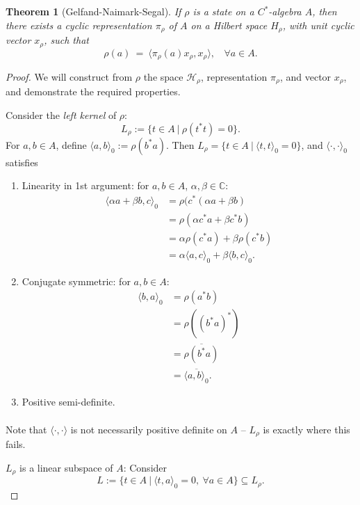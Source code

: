 \documentclass[12pt,a4paper]{amsart}
\theoremstyle{plain}
\newtheorem{thm}{Theorem}
\theoremstyle{definition}
\newcommand{\Hr}{\mathcal{H}_\rho}
\newcommand{\1}{\mathbbm{1}}
\begin{document}
\begin{thm} [Gelfand-Naimark-Segal]
	If $\rho$ is a state on a $C^\ast$-algebra $A$, then there exists a cyclic representation 
	$\pi_\rho$ of $A$ on a Hilbert space ${H}_\rho$, with unit cyclic vector $x_\rho$, such that 
	\[ 
		\rho(a)~=~ \langle \pi_\rho (a) x_\rho, x_\rho \rangle, ~~~~ \forall a \in A.
	\]
\end{thm}
\begin{proof}
	We will construct from $\rho$ the space $\Hr$,  representation $\pi_\rho$, 
	and vector $x_\rho$, and demonstrate the required properties.
	
	Consider the \emph{left kernel} of $\rho$:
	\[
		L_\rho := \{t \in A ~|~ \rho (t ^\ast t) = 0 \}.
	\]	
	For $a,b \in A$, define $\langle a , b \rangle_0 := \rho(b^\ast a)$.
	Then $L_\rho = \{t\in A ~|~ \langle t , t \rangle _0 = 0 \} $, and 
	$\langle \cdot, \cdot \rangle_0$ satisfies
	\begin{enumerate}[label=(\roman*)]
	  \item Linearity in 1st argument: for $a,b\in A$, $\alpha, \beta \in \mathbb{C}$:
		\begin{align*}
		   \langle \alpha a + \beta b, c \rangle_0 
		&= \rho (c^\ast(\alpha a + \beta b)   								\\
		&= \rho (\alpha c^\ast a + \beta c^\ast b)  						\\
		&= \alpha \rho (c^\ast a) + \beta \rho (c^\ast b)					\\
		&= \alpha \langle a , c \rangle_0 + \beta \langle b, c \rangle_0.
		\end{align*}
	  \item Conjugate symmetric: for $a,b \in A$:
	  	\begin{align*}
	  	   \langle b,a \rangle _0 
	  	&= \rho (a^\ast b)													\\
	  	&= \rho ((b^\ast a)^\ast)											\\
	  	&= \overline{\rho (b^\ast a)}										\\
	  	&= \overline{\langle a,b \rangle _0 }.
	  	\end{align*}
	  \item Positive semi-definite. 
	  	\begin{align*}
	  	\end{align*}
	\end{enumerate}
	Note that $\langle \cdot, \cdot \rangle$ is not necessarily positive definite on 
	$A$ -- $L_\rho$ is exactly where this fails.
	
	$L_\rho$ is  a linear subspace of $A$: Consider 
	\[
		L:= \{t \in A  ~|~ \langle t,a \rangle _0 = 0, ~\forall a \in A \}\subseteq L_\rho.
	\]
	

\end{proof}
\end{document}
